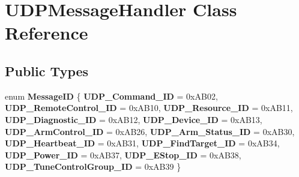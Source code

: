 \hypertarget{classUDPMessageHandler}{}\section{U\+D\+P\+Message\+Handler Class Reference}
\label{classUDPMessageHandler}
\subsection*{Public Types}
\begin{DoxyCompactItemize}
\item 
\mbox{\label{classUDPMessageHandler_a7421fd19ecb6ccac8a790287dd9f7b52}} 
enum {\bfseries Message\+ID} \{ \newline
{\bfseries U\+D\+P\+\_\+\+Command\+\_\+\+ID} = 0x\+A\+B02, 
{\bfseries U\+D\+P\+\_\+\+Remote\+Control\+\_\+\+ID} = 0x\+A\+B10, 
{\bfseries U\+D\+P\+\_\+\+Resource\+\_\+\+ID} = 0x\+A\+B11, 
{\bfseries U\+D\+P\+\_\+\+Diagnostic\+\_\+\+ID} = 0x\+A\+B12, 
\newline
{\bfseries U\+D\+P\+\_\+\+Device\+\_\+\+ID} = 0x\+A\+B13, 
{\bfseries U\+D\+P\+\_\+\+Arm\+Control\+\_\+\+ID} = 0x\+A\+B26, 
{\bfseries U\+D\+P\+\_\+\+Arm\+\_\+\+Status\+\_\+\+ID} = 0x\+A\+B30, 
{\bfseries U\+D\+P\+\_\+\+Heartbeat\+\_\+\+ID} = 0x\+A\+B31, 
\newline
{\bfseries U\+D\+P\+\_\+\+Find\+Target\+\_\+\+ID} = 0x\+A\+B34, 
{\bfseries U\+D\+P\+\_\+\+Power\+\_\+\+ID} = 0x\+A\+B37, 
{\bfseries U\+D\+P\+\_\+\+E\+Stop\+\_\+\+ID} = 0x\+A\+B38, 
{\bfseries U\+D\+P\+\_\+\+Tune\+Control\+Group\+\_\+\+ID} = 0x\+A\+B39
 \}
\end{DoxyCompactItemize}
